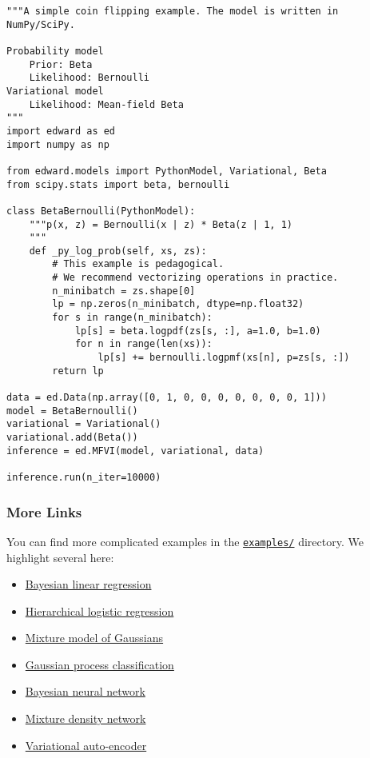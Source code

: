 \begin{verbatim}
"""A simple coin flipping example. The model is written in NumPy/SciPy.

Probability model
    Prior: Beta
    Likelihood: Bernoulli
Variational model
    Likelihood: Mean-field Beta
"""
import edward as ed
import numpy as np

from edward.models import PythonModel, Variational, Beta
from scipy.stats import beta, bernoulli

class BetaBernoulli(PythonModel):
    """p(x, z) = Bernoulli(x | z) * Beta(z | 1, 1)
    """
    def _py_log_prob(self, xs, zs):
        # This example is pedagogical.
        # We recommend vectorizing operations in practice.
        n_minibatch = zs.shape[0]
        lp = np.zeros(n_minibatch, dtype=np.float32)
        for s in range(n_minibatch):
            lp[s] = beta.logpdf(zs[s, :], a=1.0, b=1.0)
            for n in range(len(xs)):
                lp[s] += bernoulli.logpmf(xs[n], p=zs[s, :])
        return lp

data = ed.Data(np.array([0, 1, 0, 0, 0, 0, 0, 0, 0, 1]))
model = BetaBernoulli()
variational = Variational()
variational.add(Beta())
inference = ed.MFVI(model, variational, data)

inference.run(n_iter=10000)
\end{verbatim}

\subsubsection{More Links}\label{more-links}

You can find more complicated examples in the
\href{https://github.com/blei-lab/edward/tree/master/examples}{\texttt{examples/}}
directory. We highlight several here:

\begin{itemize}
\tightlist
\item
  \href{https://github.com/blei-lab/edward/blob/master/examples/bayesian_linear_regression.py}{Bayesian
  linear regression}
\item
  \href{https://github.com/blei-lab/edward/blob/master/examples/hierarchical_logistic_regression.py}{Hierarchical
  logistic regression}
\item
  \href{https://github.com/blei-lab/edward/blob/master/examples/mixture_gaussian.py}{Mixture
  model of Gaussians}
\item
  \href{https://github.com/blei-lab/edward/blob/master/examples/gp_classification.py}{Gaussian
  process classification}
\item
  \href{https://github.com/blei-lab/edward/blob/master/examples/bayesian_nn.py}{Bayesian
  neural network}
\item
  \href{https://github.com/blei-lab/edward/blob/master/examples/mixture_density_network.py}{Mixture
  density network}
\item
  \href{https://github.com/blei-lab/edward/blob/master/examples/convolutional_vae.py}{Variational
  auto-encoder}
\end{itemize}

